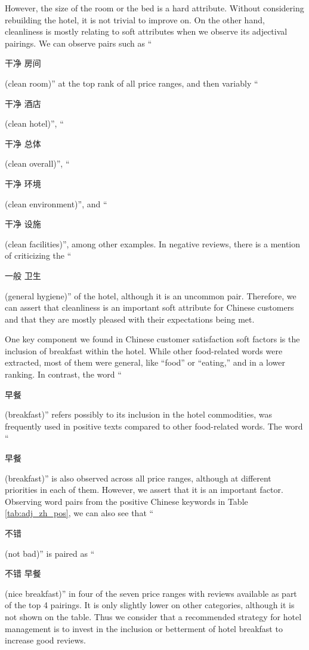 \documentclass[smallextended,natbib]{svjour3}       %
\begin{document}
    However, the size of the room or the bed is a hard attribute. Without considering rebuilding the hotel, it is not trivial to improve on. On the other hand, cleanliness is mostly relating to soft attributes when we observe its adjectival pairings. We can observe pairs such as ``\begin{CJK}{UTF8}{gbsn}干净 房间\end{CJK} (clean room)'' at the top rank of all price ranges, and then variably ``\begin{CJK}{UTF8}{gbsn}干净 酒店\end{CJK} (clean hotel)'', ``\begin{CJK}{UTF8}{gbsn}干净 总体\end{CJK} (clean overall)'', ``\begin{CJK}{UTF8}{gbsn}干净 环境\end{CJK} (clean environment)'', and ``\begin{CJK}{UTF8}{gbsn}干净 设施\end{CJK} (clean facilities)'', among other examples. In negative reviews, there is a mention of criticizing the ``\begin{CJK}{UTF8}{gbsn}一般 卫生\end{CJK} (general hygiene)'' of the hotel, although it is an uncommon pair. Therefore, we can assert that cleanliness is an important soft attribute for Chinese customers and that they are mostly pleased with their expectations being met. 

    One key component we found in Chinese customer satisfaction soft factors is the inclusion of breakfast within the hotel. While other food-related words were extracted, most of them were general, like ``food'' or ``eating,'' and in a lower ranking. In contrast, the word ``\begin{CJK}{UTF8}{gbsn}早餐\end{CJK} (breakfast)'' refers possibly to its inclusion in the hotel commodities, was frequently used in positive texts compared to other food-related words. The word ``\begin{CJK}{UTF8}{gbsn}早餐\end{CJK} (breakfast)'' is also observed across all price ranges, although at different priorities in each of them. However, we assert that it is an important factor. Observing word pairs from the positive Chinese keywords in Table \ref{tab:adj_zh_pos}, we can also see that ``\begin{CJK}{UTF8}{gbsn}不错\end{CJK} (not bad)'' is paired as ``\begin{CJK}{UTF8}{gbsn}不错 早餐\end{CJK} (nice breakfast)'' in four of the seven price ranges with reviews available as part of the top 4 pairings. It is only slightly lower on other categories, although it is not shown on the table. Thus we consider that a recommended strategy for hotel management is to invest in the inclusion or betterment of hotel breakfast to increase good reviews.
\end{document}
